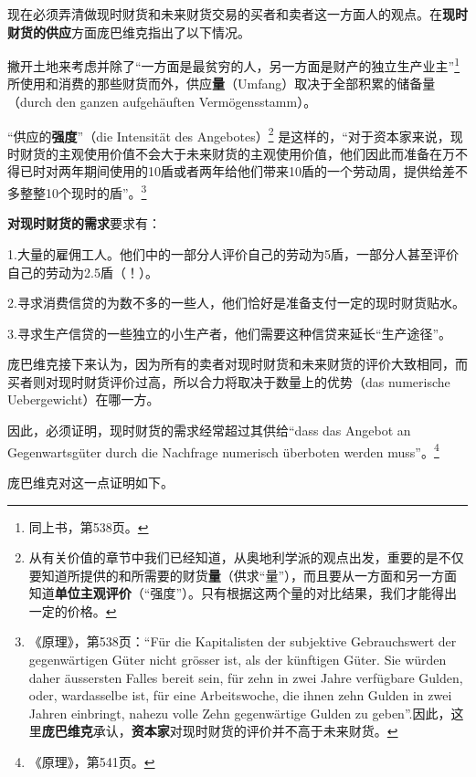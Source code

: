 \documentclass[fontset=fandol, a4paper, 12pt, openright]{ctexbook}
\begin{document}
现在必须弄清做现时财货和未来财货交易的买者和卖者这一方面人的观点。在\textbf{现时财货的供应}方面庞巴维克指出了以下情况。

撇开土地来考虑并除了“一方面是最贫穷的人，另一方面是财产的独立生产业主”\footnote{同上书，第538页。} 所使用和消费的那些财货而外，供应\textbf{量}（Umfang）取决于全部积累的储备量（durch den ganzen aufgeh\"{a}uften Verm\"{o}gensstamm）。

“供应的\textbf{强度}”（die Intensit\"{a}t des Angebotes）\footnote{从有关价值的章节中我们已经知道，从奥地利学派的观点出发，重要的是不仅要知道所提供的和所需要的财货\textbf{量}（供求“量”），而且要从一方面和另一方面知道\textbf{单位主观评价}（“强度”）。只有根据这两个量的对比结果，我们才能得出一定的价格。} 是这样的，“对于资本家来说，现时财货的主观使用价值不会大于未来财货的主观使用价值，他们因此而准备在万不得已时对两年期间使用的10盾或者两年给他们带来10盾的一个劳动周，提供给差不多整整10个现时的盾”。\footnote{《原理》，第538页：“F\"{u}r die Kapitalisten der subjektive Gebrauchswert der gegenw\"{a}rtigen G\"{u}ter nicht gr\"{o}sser ist, als der k\"{u}nftigen G\"{u}ter. Sie w\"{u}rden daher \"{a}ussersten Falles bereit sein, f\"{u}r zehn in zwei Jahre verf\"{u}gbare Gulden, oder, wardasselbe ist, f\"{u}r eine Arbeitswoche, die ihnen zehn Gulden in zwei Jahren einbringt, nahezu volle Zehn gegenw\"{a}rtige Gulden zu geben”.因此，这里\textbf{庞巴维克}承认，\textbf{资本家}对现时财货的评价并不高于未来财货。}

\textbf{对现时财货的需求}要求有：

1.大量的雇佣工人。他们中的一部分人评价自己的劳动为5盾，一部分人甚至评价自己的劳动为2.5盾（！）。

2.寻求消费信贷的为数不多的一些人，他们恰好是准备支付一定的现时财货贴水。

3.寻求生产信贷的一些独立的小生产者，他们需要这种信贷来延长“生产途径”。

庞巴维克接下来认为，因为所有的卖者对现时财货和未来财货的评价大致相同，而买者则对现时财货评价过高，所以合力将取决于数量上的优势（das numerische Uebergewicht）在哪一方。

因此，必须证明，现时财货的需求经常超过其供给“dass das Angebot an Gegenwartsg\"{u}ter durch die Nachfrage numerisch \"{u}berboten werden muss”。\footnote{《原理》，第541页。}

庞巴维克对这一点证明如下。
\end{document}
